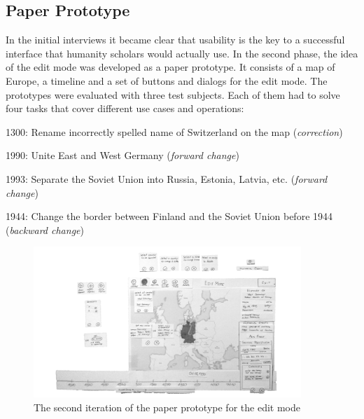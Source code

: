 

\subsection{Paper Prototype} %
\label{sub:paper_prototype}

In the initial interviews it became clear that usability is the key to a successful interface that humanity scholars would actually use. In the second phase, the idea of the edit mode was developed as a paper prototype. It consists of a map of Europe, a timeline and a set of buttons and dialogs for the edit mode. The prototypes were evaluated with three test subjects. Each of them had to solve four tasks that cover different use cases and operations:
\begin{compactenum}
  \item 1300: Rename incorrectly spelled name of Switzerland on the map (\emph{correction})
  \item 1990: Unite East and West Germany (\emph{forward change})
  \item 1993: Separate the Soviet Union into Russia, Estonia, Latvia, etc. (\emph{forward change})
  \item 1944: Change the border between Finland and the Soviet Union before 1944 (\emph{backward change})
\end{compactenum}

\begin{figure}[ht]
  \centering
  \includegraphics[width=0.9\textwidth]{graphics/development/user_interface_design_process/paper_prototype_2.png}
\caption{The second iteration of the paper prototype for the edit mode}
\label{fig:paper_prototypes}
\end{figure}

